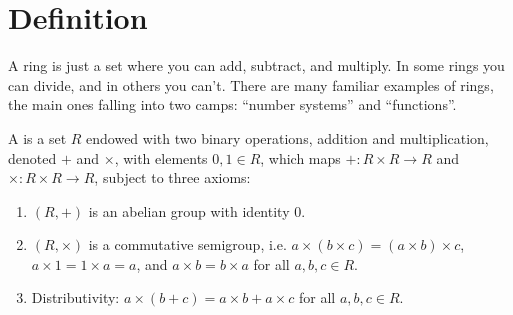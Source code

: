 \section{Definition}
A ring is just a set where you can add, subtract, and multiply. In some rings you can divide, and in others you can't. There are many familiar examples of rings, the main ones falling into two camps: ``number systems'' and ``functions''.

\begin{definition}
A  is a set $R$ endowed with two binary operations, addition and multiplication, denoted $+$ and $\times$, with elements $0,1\in R$, which maps $+: R \times R \to R$ and $\times: R \times R \to R$, subject to three axioms:
\begin{enumerate}
\item $(R,+)$ is an abelian group with identity $0$.
\item $(R,\times)$ is a commutative semigroup, i.e. $a \times (b \times c) = (a \times b) \times c$, $a \times 1 = 1 \times a = a$, and $a \times b = b \times a$ for all $a, b, c \in R$.
\item Distributivity: $a \times (b + c) = a \times b + a \times c$ for all $a, b, c \in R$.
\end{enumerate}
\end{definition}

